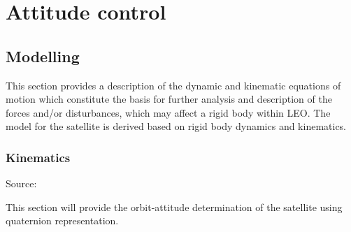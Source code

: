 \chapter{Attitude control}
\section{Modelling}
This section provides a description of the dynamic and kinematic equations of motion which constitute the basis for further analysis and description of the forces and/or disturbances, which may affect a rigid body within LEO. The model for the satellite is derived based on rigid body dynamics and kinematics. 
%
\subsection{Kinematics}
Source: \cite{SADC}

This section will provide the orbit-attitude determination of the satellite using quaternion representation. 

